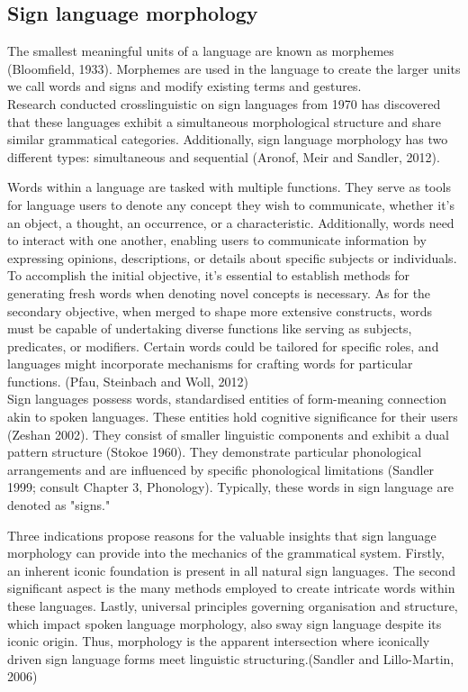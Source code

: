 \subsection{Sign language morphology}

 The smallest meaningful units of a language are known as morphemes
(Bloomfield, 1933). Morphemes are used in the language to create the larger
units we call words and signs and modify existing terms and gestures.\\

Research conducted crosslinguistic on sign languages from 1970 has discovered that these languages exhibit a simultaneous morphological structure and share similar grammatical categories. Additionally, sign language morphology has two different types: simultaneous and sequential (Aronof, Meir and Sandler, 2012). 

Words within a language are tasked with multiple functions. They serve as tools for language users to denote any concept they wish to communicate, whether it's an object, a thought, an occurrence, or a characteristic. Additionally, words need to interact with one another, enabling users to communicate information by expressing opinions, descriptions, or details about specific subjects or individuals. To accomplish the initial objective, it's essential to establish methods for generating fresh words when denoting novel concepts is necessary. As for the secondary objective, when merged to shape more extensive constructs, words must be capable of undertaking diverse functions like serving as subjects, predicates, or modifiers. Certain words could be tailored for specific roles, and languages might incorporate mechanisms for crafting words for particular functions. (Pfau, Steinbach and Woll, 2012)\\

Sign languages possess words, standardised entities of form-meaning connection akin to spoken languages. These entities hold cognitive significance for their users (Zeshan 2002). They consist of smaller linguistic components and exhibit a dual pattern structure (Stokoe 1960). They demonstrate particular phonological arrangements and are influenced by specific phonological limitations (Sandler 1999; consult Chapter 3, Phonology). Typically, these words in sign language are denoted as "signs."

Three indications propose reasons for the valuable insights that sign language morphology can provide into the mechanics of the grammatical system. Firstly, an inherent iconic foundation is present in all natural sign languages. The second significant aspect is the many methods employed to create intricate words within these languages. Lastly, universal principles governing organisation and structure, which impact spoken language morphology, also sway sign language despite its iconic origin. Thus, morphology is the apparent intersection where iconically driven sign language forms meet linguistic structuring.(Sandler and Lillo-Martin, 2006) \\

